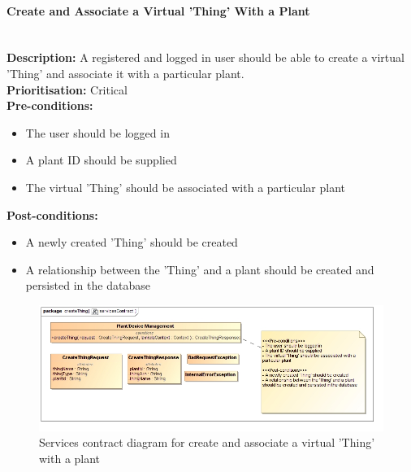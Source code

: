 \documentclass{article}
\begin{document}
\paragraph{Create and Associate a Virtual 'Thing' With a Plant}\mbox{}\\
\textbf{Description:} A registered and logged in user should be able to create a virtual 'Thing' and associate it with a particular plant.\\
\textbf{Prioritisation:} Critical\\		
\textbf{Pre-conditions:}
\begin{itemize}
	\item The user should be logged in
	\item A plant ID should be supplied
	\item The virtual 'Thing' should be associated with a particular plant
\end{itemize}
\textbf{Post-conditions:}
\begin{itemize}
	\item A newly created 'Thing' should be created
	\item A relationship between the 'Thing' and a plant should be created and persisted in the database
\end{itemize}

\begin{figure}[H]
	\includegraphics[width=\linewidth]{images/ServicesContracts/createThing.jpg}
	\caption{Services contract diagram for create and associate a virtual 'Thing' with a plant}
\end{figure}
\end{document}
